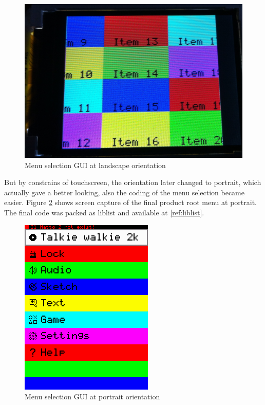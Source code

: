 \documentclass[a4paper,notitlepage,10pt]{report}
\begin{document}
\begin{multicols}{2}
\begin{figure}[H]
	\centering
	\includegraphics[width=0.9\columnwidth]{photo_ts_landscape}
	\caption{Menu selection GUI at landscape orientation}
	\label{fig:photoTSLandscape}
\end{figure}
\vspace{6pt}

But by constrains of touchscreen, the orientation later changed to portrait, which actually gave a better looking, also the coding of the menu selection became easier. Figure \ref{fig:capTFTPortrait} shows screen capture of the final product root menu at portrait. The final code was packed as liblist and available at \ref{ref:liblist}.
\vspace{6pt}

\begin{figure}[H]
	\centering
	\includegraphics[width=0.5\columnwidth]{cap_tft_portrait}
	\caption{Menu selection GUI at portrait orientation}
	\label{fig:capTFTPortrait}
\end{figure}
\vspace{6pt}


\end{multicols}
\end{document}
